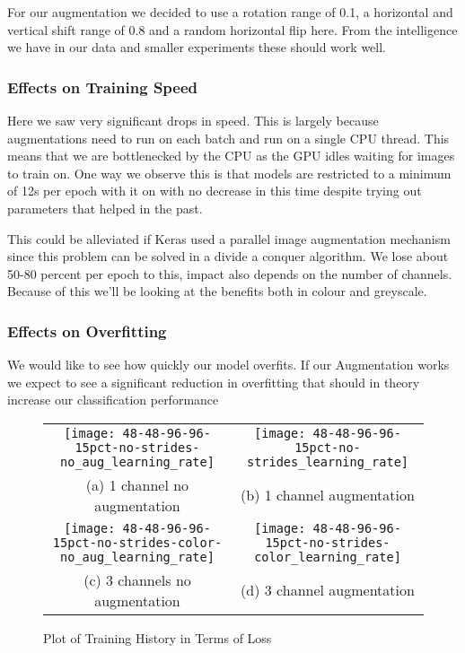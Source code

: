 For our augmentation we decided to use a rotation range of 0.1, a horizontal and vertical shift range of 0.8 and a random horizontal flip here. From the intelligence we have in our data and smaller experiments these should work well.
\subsubsection{Effects on Training Speed}
Here we saw very significant drops in speed. This is largely because augmentations need to run  on each batch and run on a single CPU thread. This means that we are bottlenecked by the CPU as the GPU idles waiting for images to train on. One way we observe this is that models are restricted to a minimum of 12s per epoch with it on with no decrease in this time despite trying out parameters that helped in the past.

This could be alleviated if Keras used a parallel image augmentation mechanism since this problem can be solved in a divide a conquer algorithm. We lose about 50-80 percent per epoch to this, impact also depends on the number of channels. Because of this we'll be looking at the benefits both in colour and greyscale.

\subsubsection{Effects on Overfitting}
We would like to see how quickly our model overfits. If our Augmentation works we expect to see a significant reduction in overfitting that should in theory increase our classification performance
\begin{figure}
	\begin{tabular}{cc}
		\texttt{[image: 48-48-96-96-15pct-no-strides-no\_aug\_learning\_rate]} &   \texttt{[image: 48-48-96-96-15pct-no-strides\_learning\_rate]} \\
		(a) 1 channel no augmentation & (b) 1 channel augmentation \\[6pt]
		\texttt{[image: 48-48-96-96-15pct-no-strides-color-no\_aug\_learning\_rate]} &   \texttt{[image: 48-48-96-96-15pct-no-strides-color\_learning\_rate]} \\
		(c) 3 channels no augmentation & (d) 3 channel augmentation \\[6pt]
	\end{tabular}
	\caption{Plot of Training History in Terms of Loss}
\end{figure}

